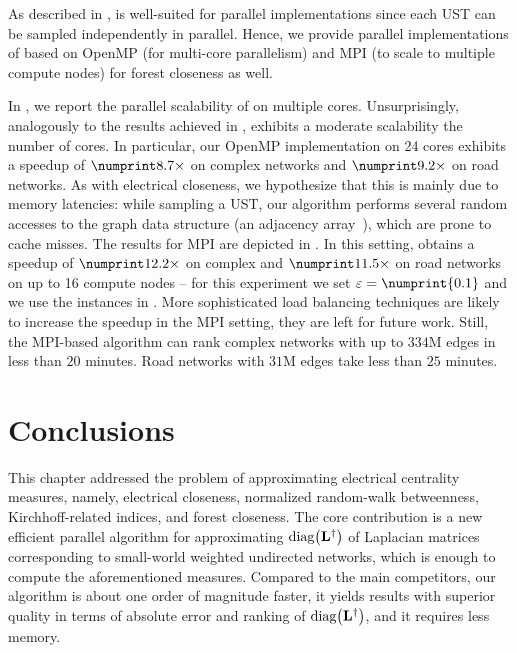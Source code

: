 As described in , \ust is well-suited for parallel
implementations since each UST can be sampled independently in parallel.
Hence, we provide parallel implementations of \ust based on OpenMP (for
multi-core parallelism) and MPI (to scale to multiple compute nodes)
for forest closeness as well.

In , we report the parallel scalability of
\ust on multiple cores. Unsurprisingly, analogously to the results achieved in
, \ust exhibits a moderate scalability \wrt the
number of cores. In particular, our OpenMP implementation on 24 cores exhibits
a speedup of $\parSpeedupCplx$ on complex networks and $\parSpeedupRoad$ on
road networks. As with electrical closeness, we hypothesize that this is mainly
due to memory latencies: while sampling a UST, our algorithm performs several
random accesses to the graph data structure (\ie an adjacency
array~\cite{DBLP:journals/netsci/StaudtSM16}), which are prone to cache misses.
%
The results for MPI are depicted in .
In this setting, \ust obtains a speedup of
$\distrSpeedupCplx$ on complex and $\distrSpeedupRoad$ on road networks
on up to 16 compute nodes -- for this experiment we set $\epsilon = \numprint{0.1}$
and we use the instances in .
More sophisticated load balancing techniques are likely to increase the speedup
in the MPI setting, they are left for future work.
Still, the MPI-based algorithm can rank complex networks with up to $334$M
edges in less than $20$ minutes. Road networks with $31$M edges take less than
$25$ minutes.

\section{Conclusions}
%
This chapter addressed the problem of approximating
electrical centrality measures, namely, electrical closeness, normalized
random-walk betweenness, Kirchhoff-related indices, and forest closeness. The
core contribution is a new efficient parallel algorithm for approximating
$\diag{\Linv}$ of Laplacian matrices \Lapl corresponding to small-world
weighted undirected networks, which is enough to compute the aforementioned
measures. Compared to the main competitors, our algorithm is about one order of
magnitude faster, it yields results with superior quality in terms of absolute
error and ranking of $\diag{\Linv}$, and it requires less memory.

